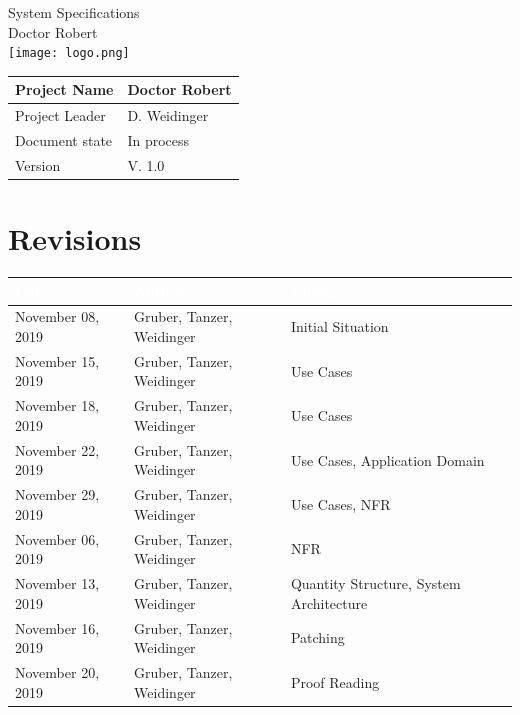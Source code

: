 \documentclass[12pt]{article}
\theoremstyle{definition}
\newcommand{\projectname}{Doctor Robert}
\newcommand{\productname}{Doctor Robert}
\newcommand{\projectleader}{D. Weidinger}
\newcommand{\documentstatus}{In process}
\newcommand{\version}{V. 1.0}
\begin{document}
\begin{titlepage}
\begin{flushright}
\end{flushright}

\vspace{10em}

\begin{center}
{\Huge System Specifications} \\[3em]
{\LARGE \productname} \\[3em]
\texttt{[image: logo.png]}\\
\end{center}

\vspace{10em}

\begin{flushleft}
\begin{tabular}{|l|l|}
\hline
Project Name & \projectname \\ \hline
Project Leader & \projectleader \\ \hline
Document state & \documentstatus \\ \hline
Version & \version \\ \hline
\end{tabular}
\end{flushleft}

\end{titlepage}

\section*{Revisions}
\begin{tabular}{|l|l|l|}
\hline
\cellcolor[gray]{0.5}\textcolor{white}{Date} & \cellcolor[gray]{0.5}\textcolor{white}{Author} & \cellcolor[gray]{0.5}\textcolor{white}{Change} \\ \hline
November 08, 2019& Gruber, Tanzer, Weidinger &Initial Situation \\ \hline
November 15, 2019& Gruber, Tanzer, Weidinger & Use Cases\\ \hline
November 18, 2019& Gruber, Tanzer, Weidinger &Use Cases \\ \hline
November 22, 2019& Gruber, Tanzer, Weidinger &Use Cases, Application Domain \\ \hline
November 29, 2019& Gruber, Tanzer, Weidinger &Use Cases, NFR \\ \hline
November 06, 2019& Gruber, Tanzer, Weidinger &NFR \\ \hline
November 13, 2019& Gruber, Tanzer, Weidinger &Quantity Structure, System Architecture \\ \hline
November 16, 2019& Gruber, Tanzer, Weidinger & Patching  \\ \hline
November 20, 2019& Gruber, Tanzer, Weidinger &Proof Reading\\ \hline
\end{tabular}
\pagebreak
\end{document}
